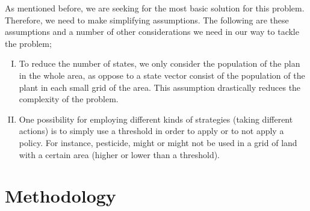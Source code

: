 \documentclass{article}
\theoremstyle{remark}
\theoremstyle{remark}
\theoremstyle{remark}
\theoremstyle{remark}
\theoremstyle{remark}
\theoremstyle{remark}
\begin{document}
As mentioned before, we are seeking for the most basic solution for this problem. Therefore, we need to make simplifying assumptions. The following are these assumptions and a number of other considerations we need in our way to tackle the problem;

\begin{enumerate}[(I)]
 \item To reduce the number of states, we only consider the population of the plan in the whole area, as oppose to a state vector consist of the population of the plant in each small grid of the area. This assumption drastically reduces the complexity of the problem.
 \item One possibility for employing different kinds of strategies (taking different actions) is to simply use a threshold in order to apply or to not apply a policy. For instance, pesticide, might or might not be used in a grid of land with a certain area (higher or lower than a threshold).
\end{enumerate}

\section{Methodology}





\end{document}
